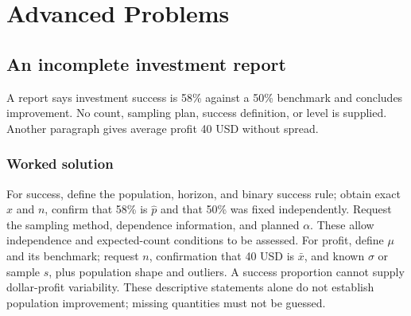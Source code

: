 \section{Advanced Problems}\label{sec:advanced}
\subsection{An incomplete investment report}\label{prob:missing}
A report says investment success is 58\% against a 50\% benchmark and concludes improvement. No count, sampling plan, success definition, or level is supplied. Another paragraph gives average profit 40 USD without spread.
\subsubsection*{Worked solution}\label{sol:missing}
For success, define the population, horizon, and binary success rule; obtain exact $x$ and $n$, confirm that 58\% is $\hat p$ and that 50\% was fixed independently. Request the sampling method, dependence information, and planned $\alpha$. These allow independence and expected-count conditions to be assessed. For profit, define $\mu$ and its benchmark; request $n$, confirmation that 40 USD is $\bar x$, and known $\sigma$ or sample $s$, plus population shape and outliers. A success proportion cannot supply dollar-profit variability. These descriptive statements alone do not establish population improvement; missing quantities must not be guessed.


